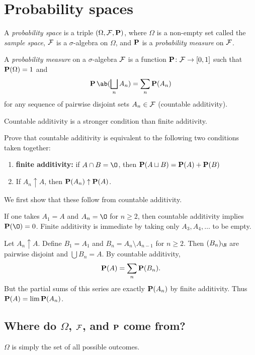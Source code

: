 \section{Probability spaces} \label{sec:prob}
\begin{definition*} \label{def:prob}
    A \emph{probability space} is a triple $(\Omega, \F, \P)$,
    where $\Omega$ is a non-empty set called the \emph{sample space},
    $\F$ is a $\sigma$-algebra on $\Omega$, and
    $\P$ is a \emph{probability measure} on $\F$.

    A \emph{probability measure} on a $\sigma$-algebra $\F$ is a function
    $\P\colon \F \to [0, 1]$ such that $\P(\Omega) = 1$ and \[
        \P\ab(\bigsqcup_n A_n) = \sum_n \P(A_n)
    \] for any sequence of pairwise disjoint sets $A_n \in \F$
    (countable additivity).
\end{definition*}
Countable additivity is a stronger condition than finite additivity.
\begin{exercise}
    Prove that countable additivity is equivalent to the following two
    conditions taken together:
    \begin{enumerate}
        \item \textbf{finite additivity:} if $A \cap B = \O$, then
            $\P(A \sqcup B) = \P(A) + \P(B)$
        \item If $A_n \uparrow A$, then $\P(A_n) \uparrow \P(A)$.
    \end{enumerate}
\end{exercise}
\begin{solution}
    We first show that these follow from countable additivity.

    If one takes $A_1 = A$ and $A_n = \O$ for $n \ge 2$, then
    countable additivity implies $\P(\O) = 0$.
    Finite additivity is immediate by taking only $A_3, A_4, \ldots$
    to be empty.

    Let $A_n \uparrow A$.
    Define $B_1 = A_1$ and $B_n = A_n \setminus A_{n-1}$ for $n \ge 2$.
    Then $(B_n)_\N$ are pairwise disjoint and $\bigcup B_n = A$.
    By countable additivity, \[
        \P(A) = \sum_n \P(B_n).
    \] But the partial sums of this series are exactly $\P(A_n)$
    by finite additivity.
    Thus $\P(A) = \lim \P(A_n)$.
\end{solution}

\subsection*{Where do $\Omega$, $\F$, and $\P$ come from?}
$\Omega$ is simply the set of all possible outcomes.

